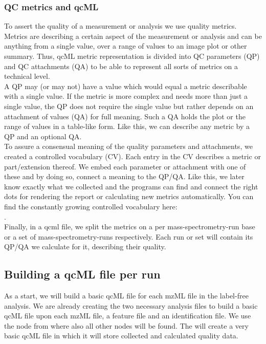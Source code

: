 \subsubsection*{QC metrics and qcML}
To assert the quality of a measurement or analysis we use quality metrics. Metrics are describing a certain aspect of the measurement or analysis and can be anything from a single value, over a range of values to an image plot or other summary. Thus, qcML metric representation is divided into QC parameters (QP) and QC attachments (QA) to be able to represent all sorts of metrics on a technical level.\\
A QP may (or may not) have a value which would equal a metric describable with a single value. If the metric is more complex and needs more than just a single value, the QP does not require the single value but rather depends on an attachment of values (QA) for full meaning. Such a QA holds the plot or the range of values in a table-like form. Like this, we can describe any metric by a QP and an optional QA.\\
To assure a consensual meaning of the quality parameters and attachments, we created a controlled vocabulary (CV). Each entry in the CV describes a metric or part/extension thereof. We embed each parameter or attachment with one of these and by doing so, connect a meaning to the QP/QA. Like this, we later know exactly what we collected and the programs can find and connect the right dots for rendering the report or calculating new metrics automatically. You can find the constantly growing controlled vocabulary here:\\ .\\
Finally, in a qcml file, we split the metrics on a per mass-spectrometry-run base or a set of mass-spectrometry-runs respectively. Each run or set will contain its QP/QA we calculate for it, describing their quality.


\subsection{Building a qcML file per run}
\label{Building a qcML file per run}

As a start, we will build a basic qcML file for each mzML file in the label-free analysis. We are already creating the two necessary analysis files to build a basic qcML file upon each mzML file, a feature file and an identification file. We use the  node from  where also all other  nodes will be found. The  will create a very basic qcML file in which it will store collected and calculated quality data.

